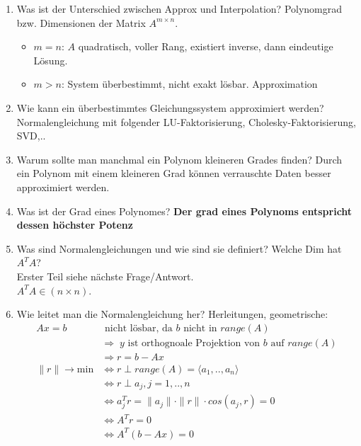\documentclass[10pt,a4paper,titlepage]{article}
\newcommand{\luf}{LU-Faktorisierung\xspace}
\newcommand{\chf}{Cholesky-Faktorisierung\xspace}
\begin{document}
\begin{enumerate}[resume=b]
	\item Was ist der Unterschied zwischen Approx und Interpolation?
	      Polynomgrad bzw. Dimensionen der Matrix $A^{m \times n}$.\\
	      \begin{itemize}
	      \item $m = n$: $A$ quadratisch, voller Rang, existiert inverse, dann eindeutige Lösung.
              \item $m > n$: System überbestimmt, nicht exakt lösbar. Approximation  
              \end{itemize}
	\item Wie kann ein überbestimmtes Gleichungssystem approximiert werden?\newline
	Normalengleichung mit folgender \luf, \chf, SVD,..
	\item Warum sollte man manchmal ein Polynom kleineren Grades finden? \newline
	Durch ein Polynom mit einem kleineren Grad können verrauschte Daten besser approximiert werden. 
	\item Was ist der Grad eines Polynomes?\newline
	\textbf{Der grad eines Polynoms entspricht dessen höchster Potenz}
	\item Was sind Normalengleichungen und wie sind sie definiert? Welche Dim hat $A^TA$?\\
              Erster Teil siehe nächste Frage/Antwort.\\
              $A^TA \in (n \times n)$.
	\item Wie leitet man die Normalengleichung her? Herleitungen, geometrische: \begin{align*}
	Ax=b & \text{ nicht lösbar, da }b \text{ nicht in }range(A)\\
	&\Rightarrow\;y\text{ ist orthognoale Projektion von } b \text{ auf }range(A)\\
	&\Rightarrow r=b-Ax\\
	\|r\|\rightarrow\text{min} &\Leftrightarrow r\perp range(A) = \langle a_1,..,a_n\rangle\\
	&\Leftrightarrow r\perp a_j, j=1,..,n\\
	&\Leftrightarrow a_j^T r=\|a_j\|\cdot\|r\|\cdot cos(a_j,r)=0\\
	&\Leftrightarrow A^Tr=0\\
	&\Leftrightarrow A^T(b-Ax)=0\\

\end{align*}
\end{enumerate}
\end{document}
